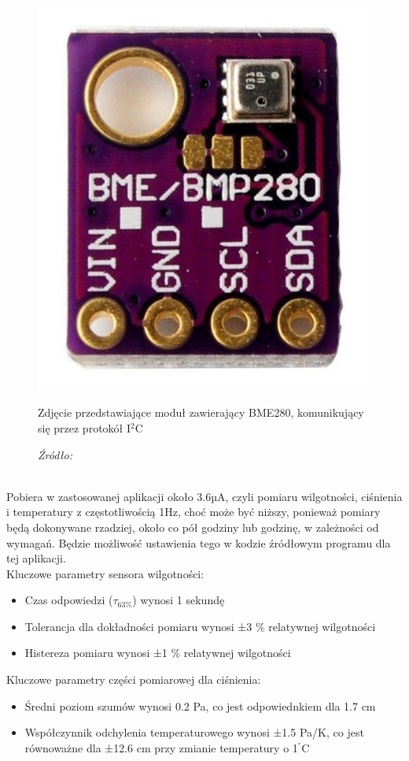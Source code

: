 \documentclass[12pt,a4paper,oneside]{memoir}
\begin{document}
\begin{figure} [h]
	\centering
	\includegraphics[scale=0.25]{images/bme280-mod.jpg}
	{\tytulyrozdzialow \footnotesize \caption[BME280 - Moduł]{Zdjęcie przedstawiające moduł zawierający BME280, komunikujący się przez protokół I$^2$C}}
	\caption*{\textit{Źródło: \cite{bme280module}}}
\end{figure}\\
\newpage
Pobiera w zastosowanej aplikacji około 3.6µA, czyli pomiaru wilgotności, ciśnienia i temperatury z częstotliwością 1Hz, choć może być niższy, ponieważ pomiary będą dokonywane rzadziej, około co pół godziny lub godzinę, w zależności od wymagań. Będzie możliwość ustawienia tego w kodzie źródłowym programu dla tej aplikacji.\\[10pt]
Kluczowe parametry sensora wilgotności:
\begin{itemize}
	\item Czas odpowiedzi ($\tau_{63\%}$) wynosi 1 sekundę
	\item Tolerancja dla dokładności pomiaru wynosi ±3 \% relatywnej wilgotności
	\item Histereza pomiaru wynosi ±1 \% relatywnej wilgotności
\end{itemize}
Kluczowe parametry części pomiarowej dla ciśnienia:
\begin{itemize}
	\item Średni poziom szumów wynosi 0.2 Pa, co jest odpowiednkiem dla 1.7 cm
	\item Współczynnik odchylenia temperaturowego wynosi ±1.5 Pa/K, co jest równoważne dla ±12.6 cm przy zmianie temperatury o 1$^°$C
\end{itemize}
\newpage
\end{document}
